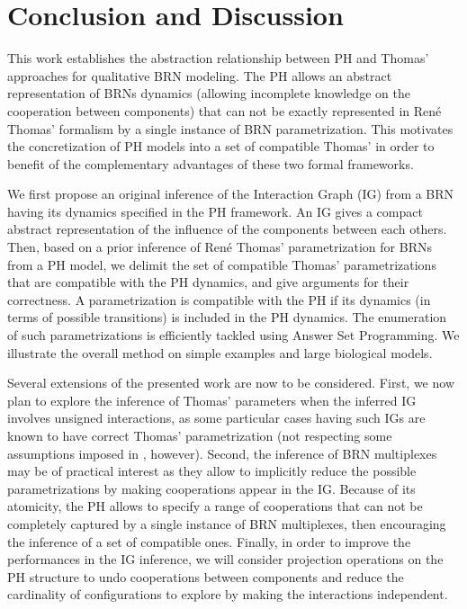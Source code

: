 \section{Conclusion and Discussion}

This work establishes the abstraction relationship between PH and Thomas' approaches for
qualitative BRN modeling.
The PH allows an abstract representation of BRNs dynamics (allowing incomplete knowledge on the
cooperation between components) that can not be exactly represented in Ren\'e Thomas' formalism by a
single instance of BRN parametrization.
This motivates the concretization of PH models into a set of compatible Thomas' in order to benefit
of the complementary advantages of these two formal frameworks.

We first propose an original inference of the Interaction Graph (IG) from a BRN
having its dynamics specified in the PH framework.
An IG gives a compact abstract representation of the influence of the components between each
others.
Then, based on a prior inference of Ren\'e Thomas' parametrization for BRNs from a PH model, we
delimit the set of compatible Thomas' parametrizations that are compatible with the PH dynamics,
and give arguments for their correctness.
A parametrization is compatible with the PH if its dynamics (in terms of possible transitions) is included in the PH dynamics.
The enumeration of such parametrizations is efficiently tackled using Answer Set Programming.
We illustrate the overall method on simple examples and large biological models.

Several extensions of the presented work are now to be considered.
First, we now plan to explore the inference of Thomas' parameters when the inferred IG involves unsigned interactions, as some particular cases having such IGs are known to have correct
Thomas' parametrization (not respecting some assumptions imposed in ,
however).
Second, the inference of BRN multiplexes \cite{BernotMultiplexes} may be of practical interest 
as they allow to implicitly reduce the possible parametrizations by making cooperations appear
in the IG.
Because of its atomicity, the PH allows to specify a range of cooperations that can not be
completely captured by a single instance of BRN multiplexes, then encouraging the inference of a set
of compatible ones.
Finally, in order to improve the performances in the IG inference, we will consider projection operations on
the PH structure to undo cooperations between components and reduce the cardinality of
configurations to explore by making the interactions independent.

